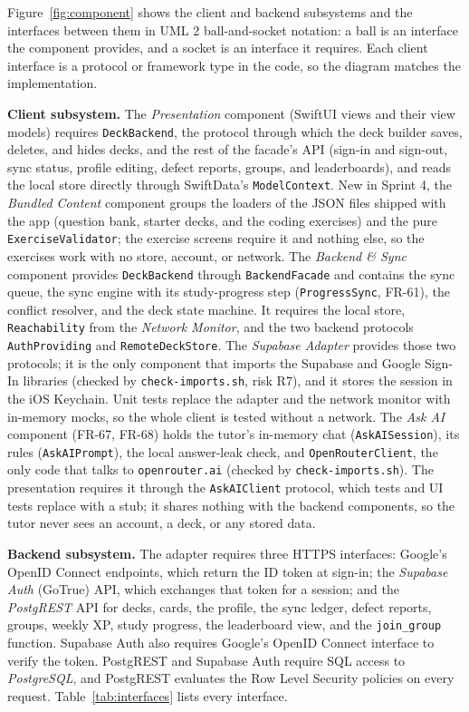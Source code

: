 \documentclass[12pt,letterpaper]{article}
\begin{document}
Figure~\ref{fig:component} shows the client and backend subsystems and the interfaces
between them in UML 2 ball-and-socket notation: a ball is an interface the component
provides, and a socket is an interface it requires. Each client interface is a protocol
or framework type in the code, so the diagram matches the implementation.

\textbf{Client subsystem.} The \emph{Presentation} component (SwiftUI views and their
view models) requires \texttt{DeckBackend}, the protocol through which the deck builder
saves, deletes, and hides decks, and the rest of the facade's API (sign-in and
sign-out, sync status, profile editing, defect reports, groups, and leaderboards),
and reads the local store directly through SwiftData's \texttt{ModelContext}. New in
Sprint 4, the \emph{Bundled Content} component groups the loaders of the JSON files
shipped with the app (question bank, starter decks, and the coding exercises) and the
pure \texttt{ExerciseValidator}; the exercise screens require it and nothing else, so
the exercises work with no store, account, or network. The \emph{Backend \& Sync} component provides
\texttt{DeckBackend} through \texttt{BackendFacade} and contains the sync queue, the
sync engine with its study-progress step (\texttt{ProgressSync}, FR-61), the conflict
resolver, and the deck state machine. It requires the local
store, \texttt{Reachability} from the \emph{Network Monitor}, and the two backend
protocols \texttt{AuthProviding} and \texttt{RemoteDeckStore}. The \emph{Supabase
Adapter} provides those two protocols; it is the only component that imports the
Supabase and Google Sign-In libraries (checked by \texttt{check-imports.sh}, risk R7),
and it stores the session in the iOS Keychain. Unit tests replace the adapter and the
network monitor with in-memory mocks, so the whole client is tested without a network.
The \emph{Ask AI} component (FR-67, FR-68) holds the tutor's in-memory chat
(\texttt{AskAISession}), its rules (\texttt{AskAIPrompt}), the local answer-leak check,
and \texttt{OpenRouterClient}, the only code that talks to \texttt{openrouter.ai}
(checked by \texttt{check-imports.sh}). The presentation requires it through the
\texttt{AskAIClient} protocol, which tests and UI tests replace with a stub; it shares
nothing with the backend components, so the tutor never sees an account, a deck, or
any stored data.

\textbf{Backend subsystem.} The adapter requires three HTTPS interfaces: Google's OpenID
Connect endpoints, which return the ID token at sign-in; the \emph{Supabase Auth}
(GoTrue) API, which exchanges that token for a session; and the \emph{PostgREST} API for
decks, cards, the profile, the sync ledger, defect reports, groups, weekly XP, study
progress, the leaderboard view, and the \texttt{join\_group} function. Supabase Auth also requires Google's
OpenID Connect interface to verify the token. PostgREST and Supabase Auth require SQL
access to \emph{PostgreSQL}, and PostgREST evaluates the Row Level Security policies on
every request. Table~\ref{tab:interfaces} lists every interface.
\end{document}
